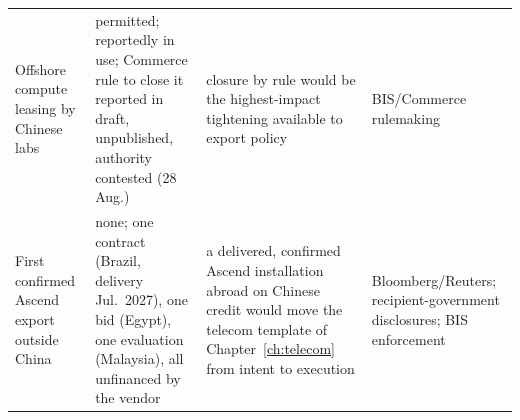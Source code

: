 \begin{small}
\begin{longtable}{p{40mm}p{24mm}p{34mm}p{40mm}}
    \addlinespace
    Offshore compute leasing by Chinese labs & permitted; reportedly in use; Commerce rule to close it reported in draft, unpublished, authority contested (28 Aug.)~\cite{remote-access-rule} & closure by rule would be the highest-impact tightening available to export policy & BIS/Commerce rulemaking \\
    \addlinespace
    First confirmed Ascend export outside China & none; one contract (Brazil, delivery Jul.\ 2027), one bid (Egypt), one evaluation (Malaysia), all unfinanced by the vendor~\cite{huawei-egypt,brazil-ai-supercomputer} & a delivered, confirmed Ascend installation abroad on Chinese credit would move the telecom template of Chapter~\ref{ch:telecom} from intent to execution & Bloomberg/Reuters; recipient-government disclosures; BIS enforcement \\
\end{longtable}
\end{small}
